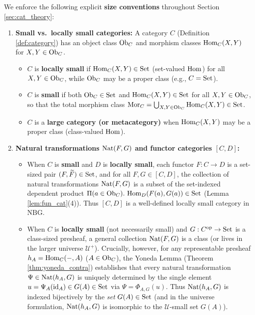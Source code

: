 \documentclass[10pt,a4paper]{article}
\begin{document}
We enforce the following explicit \textbf{size conventions} throughout Section \ref{sec:cat_theory}:
\begin{enumerate}
\item \textbf{Small vs.\ locally small categories:} A category $C$ (Definition \ref{def:category}) has an object class ${\textrm{Ob}}_C$ and morphism classes ${\textrm{Hom}}_C(X, Y)$ for $X, Y \in {\textrm{Ob}}_C$.
  \begin{itemize}
  \item $C$ is \textbf{locally small} if ${\textrm{Hom}}_C(X, Y) \in {\textrm{Set}}$ (set-valued ${\textrm{Hom}}$) for all $X, Y \in {\textrm{Ob}}_C$, while ${\textrm{Ob}}_C$ may be a proper class (e.g., $C = {\textrm{Set}}$).
  \item $C$ is \textbf{small} if both ${\textrm{Ob}}_C \in {\textrm{Set}}$ and ${\textrm{Hom}}_C(X, Y) \in {\textrm{Set}}$ for all $X, Y \in {\textrm{Ob}}_C$, so that the total morphism class ${\textrm{Mor}}_C = \bigcup_{X,Y \in {\textrm{Ob}}_C} {\textrm{Hom}}_C(X, Y) \in {\textrm{Set}}$.
  \item $C$ is a \textbf{large category (or metacategory)} when ${\textrm{Hom}}_C(X, Y)$ may be a proper class (class-valued ${\textrm{Hom}}$).
  \end{itemize}
\item \textbf{Natural transformations ${\textrm{Nat}}(F, G)$ and functor categories $[C, D]$:}
  \begin{itemize}
  \item When $C$ is \textbf{small} and $D$ is \textbf{locally small}, each functor $F : C \to D$ is a set-sized pair $(F, {\widetilde{F}\textrm{}}) \in {\textrm{Set}}$, and for all $F, G \in [C, D]$, the collection of natural transformations ${\textrm{Nat}}(F, G)$ is a subset of the set-indexed dependent product $\Pi(a \in \Ob_C).\ \Hom_D(F(a), G(a)) \in \Set$ (Lemma \ref{lem:fun_cat}(4)). Thus $[C, D]$ is a well-defined locally small category in $\mathrm{NBG}$.
  \item When $C$ is \textbf{locally small} (not necessarily small) and $G : C^{\textrm{op}} \to {\textrm{Set}}$ is a class-sized presheaf, a general collection ${\textrm{Nat}}(F, G)$ is a class (or lives in the larger universe $\mathcal{U}^+$). Crucially, however, for any representable presheaf $h_A = {\textrm{Hom}}_C(-, A)$ ($A \in {\textrm{Ob}}_C$), the Yoneda Lemma (Theorem \ref{thm:yoneda_contra}) establishes that every natural transformation $\Psi \in {\textrm{Nat}}(h_A, G)$ is uniquely determined by the single element $u = \Psi_A({\textrm{id}}_A) \in G(A) \in {\textrm{Set}}$ via $\Psi = \Phi_{A,G}(u)$. Thus ${\textrm{Nat}}(h_A, G)$ is indexed bijectively by the \emph{set} $G(A) \in {\textrm{Set}}$ (and in the universe formulation, ${\textrm{Nat}}(h_A, G)$ is isomorphic to the $\mathcal{U}$-small set $G(A)$).
  \end{itemize}

\end{enumerate}
\end{document}
